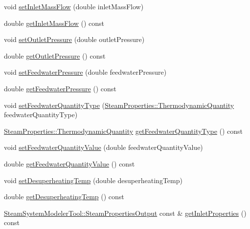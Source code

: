 \begin{DoxyCompactItemize}
void \hyperlink{class_prv_with_desuperheating_a3b018b525bfb4106cc81ac982d9daa9b}{set\+Inlet\+Mass\+Flow} (double inlet\+Mass\+Flow)
\item 
double \hyperlink{class_prv_with_desuperheating_a1befd3ab3853429f69d73f738ac29269}{get\+Inlet\+Mass\+Flow} () const
\item 
void \hyperlink{class_prv_with_desuperheating_ab89d8a884a81d1e3b056433dda988800}{set\+Outlet\+Pressure} (double outlet\+Pressure)
\item 
double \hyperlink{class_prv_with_desuperheating_a33225afd404b54159ed700afba394c03}{get\+Outlet\+Pressure} () const
\item 
void \hyperlink{class_prv_with_desuperheating_a8494ebf87e5bd834f621b0c7ca257fbe}{set\+Feedwater\+Pressure} (double feedwater\+Pressure)
\item 
double \hyperlink{class_prv_with_desuperheating_a260bbe19272694af509fb408a821b041}{get\+Feedwater\+Pressure} () const
\item 
void \hyperlink{class_prv_with_desuperheating_a3efaf028d1e6b8349a9e064605cc8d7a}{set\+Feedwater\+Quantity\+Type} (\hyperlink{class_steam_properties_ae0294bedf7d178c2d8fb6aed0f62fbff}{Steam\+Properties\+::\+Thermodynamic\+Quantity} feedwater\+Quantity\+Type)
\item 
\hyperlink{class_steam_properties_ae0294bedf7d178c2d8fb6aed0f62fbff}{Steam\+Properties\+::\+Thermodynamic\+Quantity} \hyperlink{class_prv_with_desuperheating_aa6901e00ecf819d95f79c20ef1775876}{get\+Feedwater\+Quantity\+Type} () const
\item 
void \hyperlink{class_prv_with_desuperheating_afc17940f7d61898eda1bb4a6f1fea8c3}{set\+Feedwater\+Quantity\+Value} (double feedwater\+Quantity\+Value)
\item 
double \hyperlink{class_prv_with_desuperheating_a8645a251b2e77e434a8bc51dfedcad69}{get\+Feedwater\+Quantity\+Value} () const
\item 
void \hyperlink{class_prv_with_desuperheating_ade1b153c495efb451006b3c054ff386e}{set\+Desuperheating\+Temp} (double desuperheating\+Temp)
\item 
double \hyperlink{class_prv_with_desuperheating_af334a9ff9a14d110cb2851a76d5d84fb}{get\+Desuperheating\+Temp} () const
\item 
\hyperlink{struct_steam_system_modeler_tool_1_1_steam_properties_output}{Steam\+System\+Modeler\+Tool\+::\+Steam\+Properties\+Output} const  \& \hyperlink{class_prv_with_desuperheating_afc4f229df53ded72f07debdf17352a93}{get\+Inlet\+Properties} () const
\item 

\end{DoxyCompactItemize}
